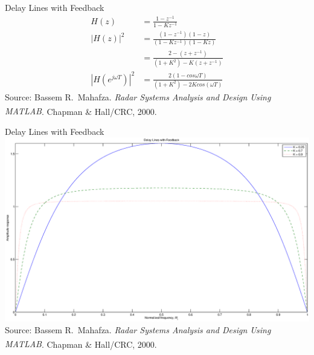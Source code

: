 \documentclass[mathserif]{beamer}
\begin{document}
    
    \begin{frame}{Delay Lines with Feedback}
      \begin{align}
      H(z) & = \frac{1 - z^{-1}}{1-Kz^{-1}} \nonumber \\
      |H(z)|^2 & = \frac{(1-z^{-1})(1-z)}{(1-Kz^{-1})(1-Kz)} \nonumber \\
      & = \frac{2-(z+z^{-1})}{(1+K^2)-K(z+z^{-1})} \nonumber \\
      \left|{H(e^{j\omega T})}\right|^2 & = \frac{2(1-cos\omega T)}{(1+K^2)-2Kcos(\omega T)} \nonumber
      \end{align}
      \vfill
    	\tiny{Source: Bassem R.~Mahafza. \emph{Radar Systems Analysis and Design Using MATLAB\textsuperscript{\textregistered}}. Chapman \& Hall/CRC, 2000.}

    \end{frame}
    
    
    \begin{frame}{Delay Lines with Feedback}
      \includegraphics[width=\linewidth]{dlFeedback}
      \tiny{Source: Bassem R.~Mahafza. \emph{Radar Systems Analysis and Design Using MATLAB\textsuperscript{\textregistered}}. Chapman \& Hall/CRC, 2000.}

    \end{frame}
    
\end{document}
